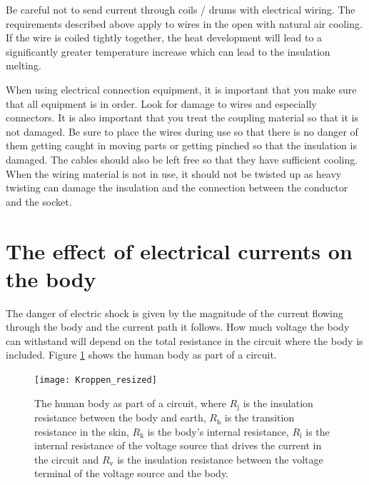 \documentclass[../Elmag-labhefte-2020.tex]{subfiles}
\begin{document}
Be careful not to send current through coils / drums with electrical wiring. The requirements described above apply to wires in the open with natural air cooling. If the wire is coiled tightly together, the heat development will lead to a significantly greater temperature increase which can lead to the insulation melting.

When using electrical connection equipment, it is important that you make sure that all equipment is in order. Look for damage to wires and especially connectors. It is also important that you treat the coupling material so that it is not damaged. Be sure to place the wires during use so that there is no danger of them getting caught in moving parts or getting pinched so that the insulation is damaged. The cables should also be left free so that they have sufficient cooling. When the wiring material is not in use, it should not be twisted up as heavy twisting can damage the insulation and the connection between the conductor and the socket.


\section{The effect of electrical currents on the body}

The danger of electric shock is given by the magnitude of the current flowing through the body and the current path it follows. How much voltage the body can withstand will depend on the total resistance in the circuit where the body is included. Figure \ref{fig:Kroppen} shows the human body as part of a circuit.


\begin{figure}[htbp] 
    \centering
    \texttt{[image: Kroppen\_resized]}
    \caption{
The human body as part of a circuit, where $R_\text{j} $ is the insulation resistance between the body and earth, $R_\text {h} $ is the transition resistance in the skin, $ R_\text {k} $ is the body's internal resistance, $ R_\text {i} $ is the internal resistance of the voltage source that drives the current in the circuit and $ R_\text {v} $ is the insulation resistance between the voltage terminal of the voltage source and the body. 
    }
    \label{fig:Kroppen}
\end{figure}
\end{document}
